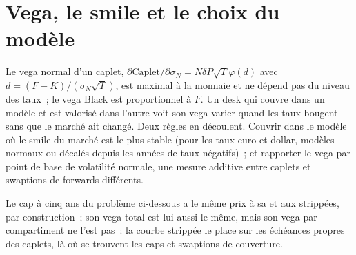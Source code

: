 \section{Vega, le smile et le choix du modèle}

Le vega normal d'un caplet, $\partial\mathrm{Caplet}/\partial\sigma_N =
N\delta P\sqrt T\varphi(d)$ avec $d=(F-K)/(\sigma_N\sqrt T)$, est maximal à la
monnaie et ne dépend pas du niveau des taux~; le vega Black est
proportionnel à $F$. Un desk qui couvre dans un modèle et est valorisé dans l'autre
voit son vega varier quand les taux bougent sans que le marché ait changé. Deux règles en découlent.
Couvrir dans le modèle où le smile du marché est le plus stable (pour les taux euro et
dollar, modèles normaux ou décalés depuis les années de taux négatifs)~; et
rapporter le vega par point de base de volatilité normale, une mesure additive entre
caplets et swaptions de forwards différents.

\begin{omfigure}

\label{fig:rc:vanilla-rates-options:capstrike}
\end{omfigure}

\begin{remark}\label{rem:rc:vanilla-rates-options:samerisk}
Le cap à cinq ans du problème ci-dessous a le même prix à sa 
et aux  strippées, par construction~; son vega total
est lui aussi le même, mais son vega par compartiment ne l'est pas~: la courbe strippée le place
sur les échéances propres des caplets, là où se trouvent les caps et swaptions de couverture.
\end{remark}

